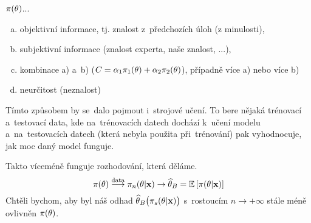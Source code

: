 $\pi(\theta)$...\begin{enumerate}[a)]
	\item objektivní informace, tj. znalost z~předchozích úloh (z minulosti),
	\item subjektivní informace (znalost experta, naše znalost, ...),
	\item kombinace a) a~b) ($C=\alpha_1\pi_1(\theta)+\alpha_2\pi_2(\theta)$), případně více a) nebo více b)
	\item neurčitost (neznalost)
\end{enumerate}
\begin{remark}
	Tímto způsobem by se~dalo pojmout i~strojové učení. To bere nějaká trénovací a~testovací data, kde na~trénovacích datech dochází k~učení modelu a~na~testovacích datech (která nebyla použita při~trénování) pak vyhodnocuje, jak moc daný model funguje.
\end{remark}
Takto víceméně funguje rozhodování, která děláme. 
$$ \pi(\theta)\stackrel{\text{data}}{\longrightarrow}\pi_n(\theta|\textbf{x})\to \widehat{\theta}_B=\mathbb{E}\left[ \pi(\theta|\textbf{x}) \right]$$
Chtěli bychom, aby byl náš odhad $\widehat{\theta}_B\big( \pi_s(\theta|\textbf{x}) \big)$ s~rostoucím $n\to+\infty$ stále méně ovlivněn $\pi(\theta)$.

